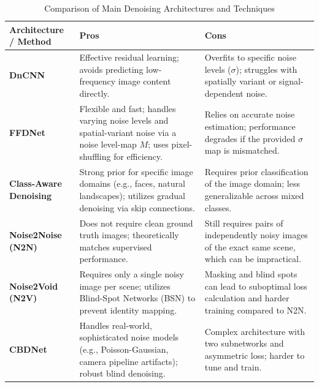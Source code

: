 \begin{table}[h]
\centering
\begin{tabularx}{\textwidth}{| >{\centering\arraybackslash}m{3.5cm} | X | X |}
\hline
\textbf{Architecture / Method} & \textbf{Pros} & \textbf{Cons} \\
\hline
\textbf{DnCNN} & Effective residual learning; avoids predicting low-frequency image content directly. & Overfits to specific noise levels ($\sigma$); struggles with spatially variant or signal-dependent noise. \\
\hline
\textbf{FFDNet} & Flexible and fast; handles varying noise levels and spatial-variant noise via a noise level-map $M$; uses pixel-shuffling for efficiency. & Relies on accurate noise estimation; performance degrades if the provided $\sigma$ map is mismatched. \\
\hline
\textbf{Class-Aware Denoising} & Strong prior for specific image domains (e.g., faces, natural landscapes); utilizes gradual denoising via skip connections. & Requires prior classification of the image domain; less generalizable across mixed classes. \\
\hline
\textbf{Noise2Noise (N2N)} & Does not require clean ground truth images; theoretically matches supervised performance. & Still requires pairs of independently noisy images of the exact same scene, which can be impractical. \\
\hline
\textbf{Noise2Void (N2V)} & Requires only a single noisy image per scene; utilizes Blind-Spot Networks (BSN) to prevent identity mapping. & Masking and blind spots can lead to suboptimal loss calculation and harder training compared to N2N. \\
\hline
\textbf{CBDNet} & Handles real-world, sophisticated noise models (e.g., Poisson-Gaussian, camera pipeline artifacts); robust blind denoising. & Complex architecture with two subnetworks and asymmetric loss; harder to tune and train. \\
\hline
\end{tabularx}
\caption{Comparison of Main Denoising Architectures and Techniques}
\label{tab:denoising-architectures}
\end{table}

